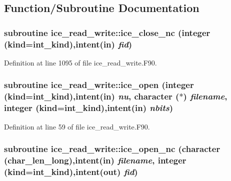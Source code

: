 \subsection{Function/Subroutine Documentation}
\hypertarget{namespaceice__read__write_ae296957254d38ce1229d08bd1ded45a6}{
\subsubsection[{ice\_\-close\_\-nc}]{\setlength{\rightskip}{0pt plus 5cm}subroutine ice\_\-read\_\-write::ice\_\-close\_\-nc (integer (kind=int\_\-kind),intent(in) {\em fid})}}
\label{namespaceice__read__write_ae296957254d38ce1229d08bd1ded45a6}


Definition at line 1095 of file ice\_\-read\_\-write.F90.\hypertarget{namespaceice__read__write_ad696392c65cb5608c5d752fd21772c6c}{
\subsubsection[{ice\_\-open}]{\setlength{\rightskip}{0pt plus 5cm}subroutine ice\_\-read\_\-write::ice\_\-open (integer (kind=int\_\-kind),intent(in) {\em nu}, \/  character ($\ast$) {\em filename}, \/  integer (kind=int\_\-kind),intent(in) {\em nbits})}}
\label{namespaceice__read__write_ad696392c65cb5608c5d752fd21772c6c}


Definition at line 59 of file ice\_\-read\_\-write.F90.\hypertarget{namespaceice__read__write_ab2f5aad237f6bdcee1e5e90537050822}{
\subsubsection[{ice\_\-open\_\-nc}]{\setlength{\rightskip}{0pt plus 5cm}subroutine ice\_\-read\_\-write::ice\_\-open\_\-nc (character (char\_\-len\_\-long),intent(in) {\em filename}, \/  integer (kind=int\_\-kind),intent(out) {\em fid})}}
\label{namespaceice__read__write_ab2f5aad237f6bdcee1e5e90537050822}


